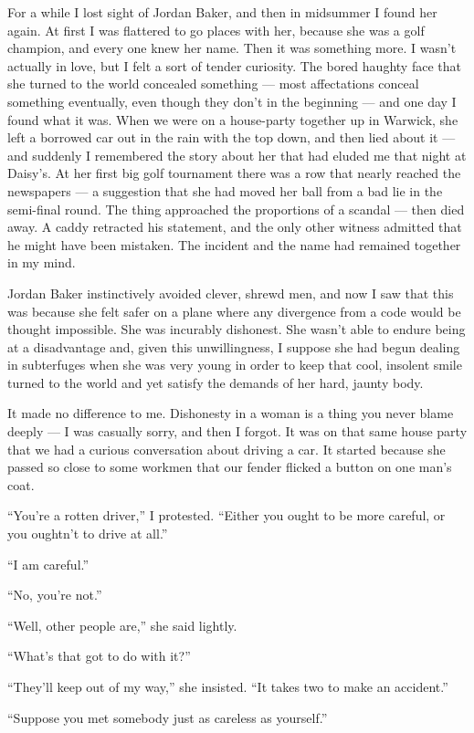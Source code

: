 \documentclass{znotebook}
\begin{document}
For a while I lost sight of Jordan Baker, and then in midsummer I found her again. At first I was flattered to go places with her, because she was a golf champion, and every one knew her name. Then it was something more. I wasn't actually in love, but I felt a sort of tender curiosity. The bored haughty face that she turned to the world concealed something — most affectations conceal something eventually, even though they don't in the beginning — and one day I found what it was. When we were on a house-party together up in Warwick, she left a borrowed car out in the rain with the top down, and then lied about it — and suddenly I remembered the story about her that had eluded me that night at Daisy's. At her first big golf tournament there was a row that nearly reached the newspapers — a suggestion that she had moved her ball from a bad lie in the semi-final round. The thing approached the proportions of a scandal — then died away. A caddy retracted his statement, and the only other witness admitted that he might have been mistaken. The incident and the name had remained together in my mind.

Jordan Baker instinctively avoided clever, shrewd men, and now I saw that this was because she felt safer on a plane where any divergence from a code would be thought impossible. She was incurably dishonest. She wasn't able to endure being at a disadvantage and, given this unwillingness, I suppose she had begun dealing in subterfuges when she was very young in order to keep that cool, insolent smile turned to the world and yet satisfy the demands of her hard, jaunty body.

It made no difference to me. Dishonesty in a woman is a thing you never blame deeply — I was casually sorry, and then I forgot. It was on that same house party that we had a curious conversation about driving a car. It started because she passed so close to some workmen that our fender flicked a button on one man's coat.

``You're a rotten driver,'' I protested. ``Either you ought to be more careful, or you oughtn't to drive at all.''

``I am careful.''

``No, you're not.''

``Well, other people are,'' she said lightly.

``What's that got to do with it?''

``They'll keep out of my way,'' she insisted. ``It takes two to make an accident.''

``Suppose you met somebody just as careless as yourself.''
\end{document}

